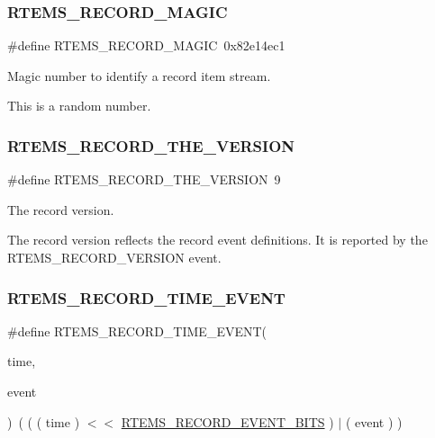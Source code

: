 \subsubsection{\texorpdfstring{RTEMS\_RECORD\_MAGIC}{RTEMS\_RECORD\_MAGIC}}
{\footnotesize\ttfamily \#define R\+T\+E\+M\+S\+\_\+\+R\+E\+C\+O\+R\+D\+\_\+\+M\+A\+G\+IC~0x82e14ec1}



Magic number to identify a record item stream. 

This is a random number. \mbox{\label{group__RTEMSRecord_gaa449476bd4e08ac99b32f137efdaa00d}} 
\subsubsection{\texorpdfstring{RTEMS\_RECORD\_THE\_VERSION}{RTEMS\_RECORD\_THE\_VERSION}}
{\footnotesize\ttfamily \#define R\+T\+E\+M\+S\+\_\+\+R\+E\+C\+O\+R\+D\+\_\+\+T\+H\+E\+\_\+\+V\+E\+R\+S\+I\+ON~9}



The record version. 

The record version reflects the record event definitions. It is reported by the R\+T\+E\+M\+S\+\_\+\+R\+E\+C\+O\+R\+D\+\_\+\+V\+E\+R\+S\+I\+ON event. \mbox{\label{group__RTEMSRecord_ga1aeb8cd2e899b3db6889622dfebd8891}} 
\subsubsection{\texorpdfstring{RTEMS\_RECORD\_TIME\_EVENT}{RTEMS\_RECORD\_TIME\_EVENT}}
{\footnotesize\ttfamily \#define R\+T\+E\+M\+S\+\_\+\+R\+E\+C\+O\+R\+D\+\_\+\+T\+I\+M\+E\+\_\+\+E\+V\+E\+NT(\begin{DoxyParamCaption}\item[{}]{time,  }\item[{}]{event }\end{DoxyParamCaption})~( ( ( time ) $<$$<$ \mbox{\hyperlink{group__RTEMSRecord_gabcfd0807c7a68e7c378e9f3c3c08b296}{R\+T\+E\+M\+S\+\_\+\+R\+E\+C\+O\+R\+D\+\_\+\+E\+V\+E\+N\+T\+\_\+\+B\+I\+TS}} ) $\vert$ ( event ) )}



